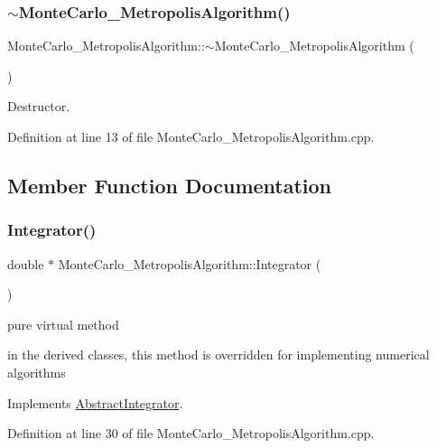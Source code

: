 \subsubsection{\texorpdfstring{$\sim$\+Monte\+Carlo\+\_\+\+Metropolis\+Algorithm()}{~MonteCarlo\_MetropolisAlgorithm()}}
{\footnotesize\ttfamily Monte\+Carlo\+\_\+\+Metropolis\+Algorithm\+::$\sim$\+Monte\+Carlo\+\_\+\+Metropolis\+Algorithm (\begin{DoxyParamCaption}{ }\end{DoxyParamCaption})}



Destructor. 



Definition at line 13 of file Monte\+Carlo\+\_\+\+Metropolis\+Algorithm.\+cpp.



\subsection{Member Function Documentation}
\mbox{\label{class_monte_carlo___metropolis_algorithm_a93fba72a50330bf184156e23158992b2}} 
\subsubsection{\texorpdfstring{Integrator()}{Integrator()}}
{\footnotesize\ttfamily double $\ast$ Monte\+Carlo\+\_\+\+Metropolis\+Algorithm\+::\+Integrator (\begin{DoxyParamCaption}{ }\end{DoxyParamCaption})\hspace{0.3cm}{\ttfamily [virtual]}}



pure virtual method 

in the derived classes, this method is overridden for implementing numerical algorithms 

Implements \hyperlink{class_abstract_integrator_a073d8f87239f732b3d2832070caa3b17}{Abstract\+Integrator}.



Definition at line 30 of file Monte\+Carlo\+\_\+\+Metropolis\+Algorithm.\+cpp.


